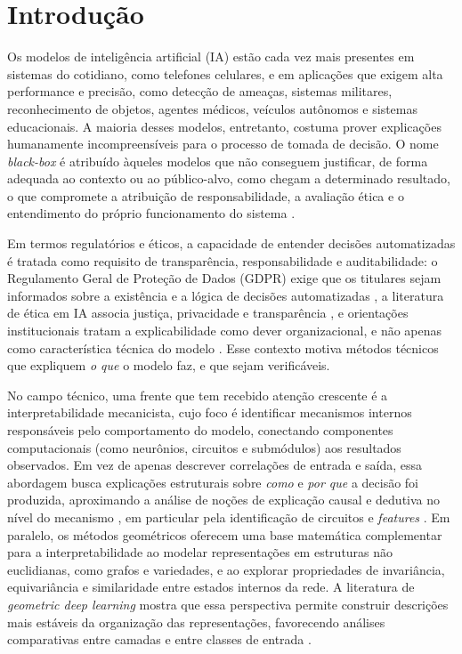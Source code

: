 \section{Introdução}

Os modelos de inteligência artificial (IA) estão cada vez mais presentes em sistemas do cotidiano, como telefones celulares, e em aplicações que exigem alta performance e precisão, como detecção de ameaças, sistemas militares, reconhecimento de objetos, agentes médicos, veículos autônomos e sistemas educacionais. A maioria desses modelos, entretanto, costuma prover explicações humanamente incompreensíveis para o processo de tomada de decisão. O nome \textit{black-box} é atribuído àqueles modelos que não conseguem justificar, de forma adequada ao contexto ou ao público-alvo, como chegam a determinado resultado, o que compromete a atribuição de responsabilidade, a avaliação ética e o entendimento do próprio funcionamento do sistema \citep{Ullah2024}. 

Em termos regulatórios e éticos, a capacidade de entender decisões automatizadas é tratada como requisito de transparência, responsabilidade e auditabilidade: o Regulamento Geral de Proteção de Dados (GDPR) exige que os titulares sejam informados sobre a existência e a lógica de decisões automatizadas \citep{EU2016GDPRen, Hamon2022}, a literatura de ética em IA associa justiça, privacidade e transparência \citep{Radanliev2025}, e orientações institucionais tratam a explicabilidade como dever organizacional, e não apenas como característica técnica do modelo \citep{ICO2022}. Esse contexto motiva métodos técnicos que expliquem \emph{o que} o modelo faz, e que sejam verificáveis.

No campo técnico, uma frente que tem recebido atenção crescente é a interpretabilidade mecanicista, cujo foco é identificar mecanismos internos responsáveis pelo comportamento do modelo, conectando componentes computacionais (como neurônios, circuitos e submódulos) aos resultados observados. Em vez de apenas descrever correlações de entrada e saída, essa abordagem busca explicações estruturais sobre \textit{como} e \textit{por que} a decisão foi produzida, aproximando a análise de noções de explicação causal e dedutiva no nível do mecanismo \citep{Kastner2024}, em particular pela identificação de circuitos e \textit{features} \citep{Olah2020, Elhage2021}. Em paralelo, os métodos geométricos oferecem uma base matemática complementar para a interpretabilidade ao modelar representações em estruturas não euclidianas, como grafos e variedades, e ao explorar propriedades de invariância, equivariância e similaridade entre estados internos da rede. A literatura de \textit{geometric deep learning} mostra que essa perspectiva permite construir descrições mais estáveis da organização das representações, favorecendo análises comparativas entre camadas e entre classes de entrada \citep{Cao2020}.

